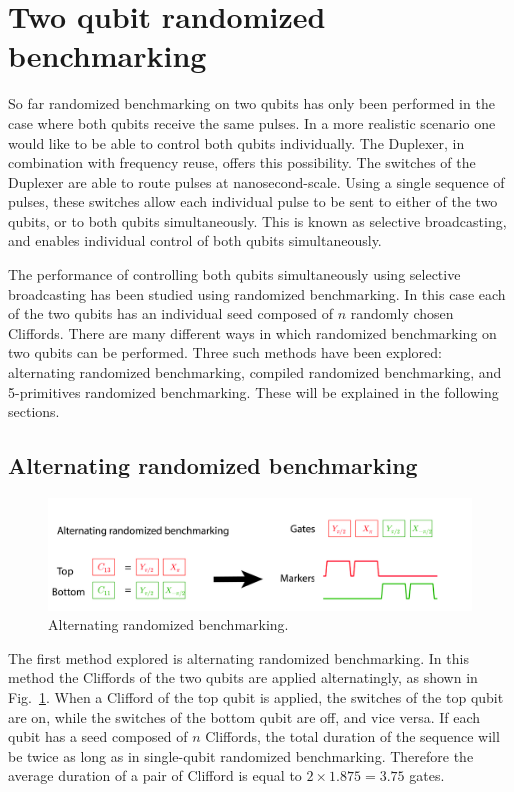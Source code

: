     \section{Two qubit randomized benchmarking}
      \label{Two qubit randomized benchmarking}
      So far randomized benchmarking on two qubits has only been performed in the case where both qubits receive the same pulses. In a more realistic scenario one would like to be able to control both qubits individually. The Duplexer, in combination with frequency reuse, offers this possibility. The switches of the Duplexer are able to route pulses at nanosecond-scale. Using a single sequence of pulses, these switches allow each individual pulse to be sent to either of the two qubits, or to both qubits simultaneously. This is known as selective broadcasting, and enables individual control of both qubits simultaneously.

      The performance of controlling both qubits simultaneously using selective broadcasting has been studied using randomized benchmarking. In this case each of the two qubits has an individual seed composed of $n$ randomly chosen Cliffords. There are many different ways in which randomized benchmarking on two qubits can be performed. Three such methods have been explored: alternating randomized benchmarking, compiled randomized benchmarking, and 5-primitives randomized benchmarking. These will be explained in the following sections.

      \subsection{Alternating randomized benchmarking}
        \label{ssec:alternating randomized benchmarking}

        \begin{figure}[h]
          \centering
          \includegraphics[width=\textwidth]{Figures/Randomized benchmarking/alternating RB.jpg}
          \caption{Alternating randomized benchmarking.}
          \label{fig:alternating RB schematic}
        \end{figure}

        The first method explored is alternating randomized benchmarking. In this method the Cliffords of the two qubits are applied alternatingly, as shown in Fig.~\ref{fig:alternating RB schematic}. When a Clifford of the top qubit is applied, the switches of the top qubit are on, while the switches of the bottom qubit are off, and vice versa. If each qubit has a seed composed of $n$ Cliffords, the total duration of the sequence will be twice as long as in single-qubit randomized benchmarking. Therefore the average duration of a pair of Clifford is equal to $2 \times 1.875 = 3.75$ gates.


